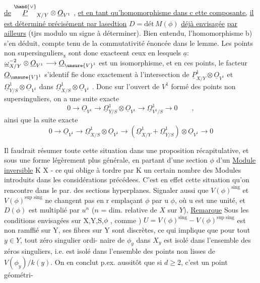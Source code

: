 
\uline{de} $\overset{\hand{\vee}}{\underline{P}}_{X/Y}\otimes\underline{O}_{V^1}$ , \uline{et en tant qu'homomorphisme dans c ette composante,}
\uline{il est déterminé précisément par lasedtion} $D = \text{dét}\,M(\phi)$ \uline{déjà envisagée}
\uline{par ailleurs} (tjrs modulo un signe à déterminer). Bien entendu,
l'homomorphisme b) s'en déduit, compte tenu de la commutativité énoncée
dans le lemme. Les points non supersinguliers$_{\text{x}}$ sont donc exacteent
ceux en lesquels $\underline{a}$: $\underline{\omega}^{-2}_{X/Y}\otimes\underline{O}_{V^1}\longrightarrow\underline{O}_{\unsure{V}^1}$ est un isomorphisme, et en
ces points,  le facteur $\underline{O}_{\unsure{V}^1}$ s'identif
fie donc exactement à l'intersection de $\underline{P}^1_{X/Y}\otimes\underline{O}_{V^1}$ et $\underline{\Omega}^1_{Y/S}\otimes\underline{O}_{V^1}$
dans $\underline{\Omega}^1_{X/S}\otimes\underline{O}_{V^1}$ . Donc sur l'ouvert de $V^1$ formé des points non
supersinguliers, on a une suite exacte
\[ 0\longrightarrow\underline{O}_{V^1}\longrightarrow\underline{\Omega}^1_{Y/S}\otimes\underline{O}_{V^1}\longrightarrow\underline{\Omega}^1_{V^1/S}\longrightarrow 0 \qquad , \]
ainsi que la suite exacte
\[ 0\longrightarrow\underline{O}_{V^1}\longrightarrow\underline{\Omega}^1_{X/S}\otimes\underline{O}_{V^1}\longrightarrow(\underline{\Omega}^1_{X/Y}+\underline{\Omega}^1_{Y/S})\otimes\underline{O}_{V^1}\longrightarrow 0 \]

\placedmargin{|} Il faudrait résumer  toute cette situation dans une proposition
récapitulative, et sous une forme légèrement plus générale, en partant
d'une section $\phi$ d'un \uline{Module inversible}  K  X - ce qui oblige
à tordre par K un certain nombre des Modules introduits dans les
considérations précédees. C'est en effet  cette situation qu'on
rencontre  dans le par. des sections hyperplanes. Signaler aussi que
\placedmargin{|} $V(\phi)^{\text{sing}}$  et $V(\phi)^{\text{sup sing}}$ ne changent pas en r emplaçant $\phi$ par u $\phi$,
où u est une unité, 
et $D(\phi)$ est multiplié par $u^n$ ($n$ = dim. relative de $X$ sur $Y$),
\uline{Remarque} Sous les conditions envisagées sur X,Y,S,$\phi$ , comme )
$U = V(\phi)^{\text{sing}}- V(\phi)^{\text{sup sing}}$ est non ramffié sur Y, ses fibres sur Y sont
discrètes, ce qui implique que pour tout $y\in Y$, tout zéro singulier ordi-%
naire de $\phi_y$ dans $X_y$ est isolé dans l'ensemble des zéros singuliers, 
i.e. est isolé dans l'ensemble des points non lisses de $V(\phi_y)/k(y)$.
 On en conclut p.ex. aussitôt que si $d\geqslant 2$, c'est un point géométri-%

